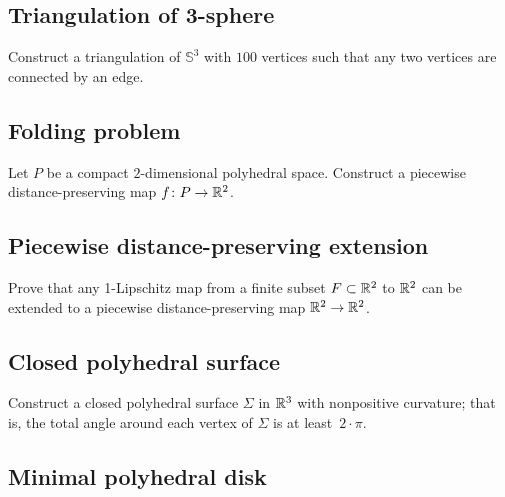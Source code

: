 \subsection*{Triangulation of 3-sphere}\label{4-poly}

\begin{pr}
Construct a triangulation of $\mathbb{S}^3$ 
with $100$ vertices
such that any two vertices are connected by an edge.
\end{pr}

\subsection*{Folding problem}\label{Folding problem}

\begin{pr}
Let $P$ be a compact $2$-dimensional 
polyhedral space. 
Construct a 
piecewise distance-preserving map
$f\colon P\to \mathbb{R}^2$.
\end{pr}

\subsection*{Piecewise distance-preserving extension}\label{iso-kirzhbraun}

\begin{pr}
Prove that any 1-Lipschitz map from a finite subset $F\subset \mathbb{R}^2$
to 
$\mathbb{R}^2$ can be extended to a 
piecewise distance-preserving map
$\mathbb{R}^2\to\mathbb{R}^2$.
\end{pr}

\subsection*{Closed polyhedral surface}\label{Closed polyhedral surface}

\begin{pr}
Construct a closed polyhedral surface $\Sigma$ in $\mathbb{R}^3$ with nonpositive curvature;
that is, the total angle around each vertex of $\Sigma$ is at least~$2\cdot\pi$.
\end{pr}

\subsection*{Minimal polyhedral disk}\label{Minimal polyhedral disk}

